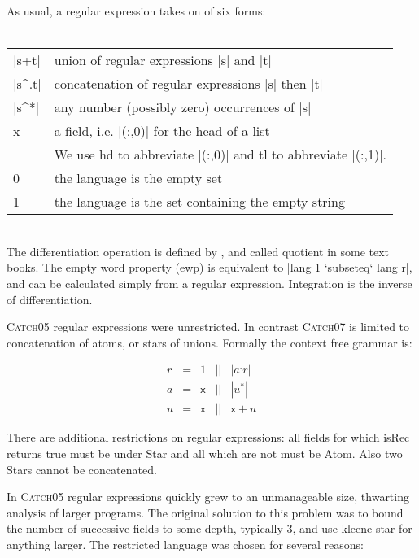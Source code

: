 \documentclass[preprint]{sigplanconf}
\newcommand{\C}[1]{\textsf{#1}}
\newcommand{\catch}{\textsc{Catch}}
\begin{document}
As usual, a regular expression takes on of six forms:\\ \\
\begin{tabular}{ll}
|s+t|  & union of regular expressions |s| and |t| \\
|s^.t| & concatenation of regular expressions |s| then |t| \\
|s^*|  & any number (possibly zero) occurrences of |s| \\
\C{x}  & a field, i.e. |(:,0)| for the head of a list \\
       & We use \C{hd} to abbreviate |(:,0)| and \C{tl} to abbreviate |(:,1)|. \\
0      & the language is the empty set \\
1      & the language is the set containing the empty string
\end{tabular} \\

The differentiation operation is defined by \citet{conway:regexp}, and called quotient in some text books. The empty word property (\C{ewp}) is equivalent to |lang 1 `subseteq` lang r|, and can be calculated simply from a regular expression. Integration is the inverse of differentiation.

\catch05 regular expressions were unrestricted. In contrast \catch07 is limited to concatenation of atoms, or stars of unions. Formally the context free grammar is:

\[\begin{array}{lllll}
r & = & 1     & || & |a^.r| \\
a & = & \C{x} & || & |u^*| \\
u & = & \C{x} & || & \C{x} + u
\end{array}\]

There are additional restrictions on regular expressions: all fields for which \C{isRec} returns true must be under \C{Star} and all which are not must be \C{Atom}. Also two \C{Star}s cannot be concatenated.

In \catch05 regular expressions quickly grew to an unmanageable size, thwarting analysis of larger programs. The original solution to this problem was to bound the number of successive fields to some depth, typically 3, and use kleene star for anything larger. The restricted language was chosen for several reasons:
\end{document}
